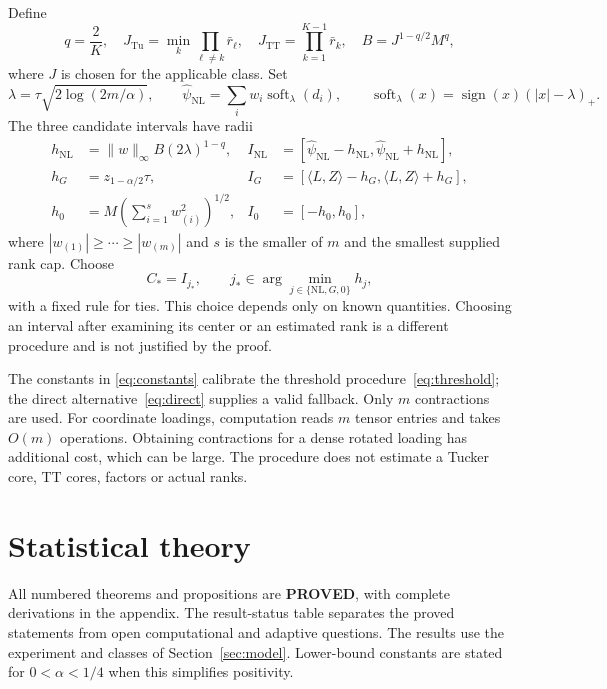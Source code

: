 \documentclass[11pt]{article}
\theoremstyle{remark}
\newcommand{\ip}[2]{\langle #1,#2\rangle}
\newcommand{\norm}[1]{\lVert #1\rVert}
\newcommand{\soft}{\operatorname{soft}}
\newcommand{\Tu}{\mathrm{Tu}}
\newcommand{\TT}{\mathrm{TT}}
\newcommand{\NL}{\mathrm{NL}}
\begin{document}
Define
\begin{equation}\label{eq:constants}
 q=\frac2K,\quad
 J_{\Tu}=\min_k\prod_{\ell\ne k}\bar r_\ell,\quad
 J_{\TT}=\prod_{k=1}^{K-1}\bar r_k,\quad B=J^{1-q/2}M^q,
\end{equation}
where $J$ is chosen for the applicable class. Set
\begin{equation}\label{eq:threshold}
 \lambda=\tau\sqrt{2\log(2m/\alpha)},\qquad
 \widehat\psi_{\NL}=\sum_iw_i\soft_\lambda(d_i),\qquad
 \soft_\lambda(x)=\operatorname{sign}(x)(|x|-\lambda)_+.
\end{equation}
The three candidate intervals have radii
\begin{align}
 h_{\NL}&=\norm w_\infty B(2\lambda)^{1-q},&
 I_{\NL}&=[\widehat\psi_{\NL}-h_{\NL},\widehat\psi_{\NL}+h_{\NL}],\label{eq:nl}\\
 h_G&=z_{1-\alpha/2}\tau,&
 I_G&=[\ip LZ-h_G,\ip LZ+h_G],\label{eq:direct}\\
 h_0&=M\left(\sum_{i=1}^s w_{(i)}^2\right)^{1/2},&
 I_0&=[-h_0,h_0],\label{eq:zero}
\end{align}
where $|w_{(1)}|\ge\cdots\ge|w_{(m)}|$ and $s$ is the smaller of $m$ and the smallest supplied rank cap. Choose
\begin{equation}\label{eq:select}
 C_*=I_{j_*},\qquad j_*\in\arg\min_{j\in\{\NL,G,0\}}h_j,
\end{equation}
with a fixed rule for ties. This choice depends only on known quantities. Choosing an interval after examining its center or an estimated rank is a different procedure and is not justified by the proof.

The constants in \eqref{eq:constants} calibrate the threshold procedure~\eqref{eq:threshold}; the direct alternative~\eqref{eq:direct} supplies a valid fallback. Only $m$ contractions are used. For coordinate loadings, computation reads $m$ tensor entries and takes $O(m)$ operations. Obtaining contractions for a dense rotated loading has additional cost, which can be large. The procedure does not estimate a Tucker core, TT cores, factors or actual ranks.

\section{Statistical theory}\label{sec:theory}

All numbered theorems and propositions are \textbf{PROVED}, with complete derivations in the appendix. The result-status table separates the proved statements from open computational and adaptive questions. The results use the experiment and classes of Section~\ref{sec:model}. Lower-bound constants are stated for $0<\alpha<1/4$ when this simplifies positivity.
\end{document}
